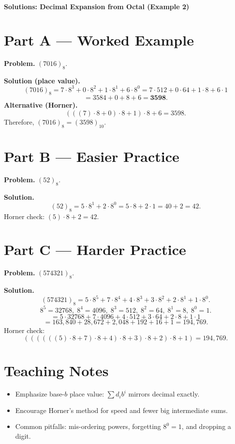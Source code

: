 \documentclass[12pt]{article}
\begin{document}
\begin{center}
\Large\textbf{Solutions: Decimal Expansion from Octal (Example 2)}
\end{center}

\section*{Part A — Worked Example}
\textbf{Problem.} $(7016)_8$.

\textbf{Solution (place value).}
\[
(7016)_8 = 7\cdot 8^3 + 0\cdot 8^2 + 1\cdot 8^1 + 6\cdot 8^0
= 7\cdot 512 + 0\cdot 64 + 1\cdot 8 + 6\cdot 1
\]
\[
= 3584 + 0 + 8 + 6 = \mathbf{3598}.
\]
\textbf{Alternative (Horner).}
\[
(((7)\cdot 8 + 0)\cdot 8 + 1)\cdot 8 + 6 = 3598.
\]
Therefore, $\boxed{(7016)_8 = (3598)_{10}}$.

\section*{Part B — Easier Practice}
\textbf{Problem.} $(52)_8$.

\textbf{Solution.}
\[
(52)_8 = 5\cdot 8^1 + 2\cdot 8^0 = 5\cdot 8 + 2\cdot 1 = 40 + 2 = \boxed{42}.
\]
Horner check: $(5)\cdot 8 + 2 = 42$.

\section*{Part C — Harder Practice}
\textbf{Problem.} $(574321)_8$.

\textbf{Solution.}
\[
(574321)_8 = 5\cdot 8^5 + 7\cdot 8^4 + 4\cdot 8^3 + 3\cdot 8^2 + 2\cdot 8^1 + 1\cdot 8^0.
\]
\[
8^5=32768,\; 8^4=4096,\; 8^3=512,\; 8^2=64,\; 8^1=8,\; 8^0=1.
\]
\[
= 5\cdot 32768 + 7\cdot 4096 + 4\cdot 512 + 3\cdot 64 + 2\cdot 8 + 1\cdot 1
\]
\[
= 163{,}840 + 28{,}672 + 2{,}048 + 192 + 16 + 1
= \boxed{194{,}769}.
\]
Horner check:
\[
((((((5)\cdot 8 + 7)\cdot 8 + 4)\cdot 8 + 3)\cdot 8 + 2)\cdot 8 + 1) = 194{,}769.
\]

\section*{Teaching Notes}
\begin{itemize}
  \item Emphasize base-$b$ place value: $\sum d_i b^i$ mirrors decimal exactly.
  \item Encourage Horner’s method for speed and fewer big intermediate sums.
  \item Common pitfalls: mis-ordering powers, forgetting $8^0=1$, and dropping a digit.
\end{itemize}
\end{document}
